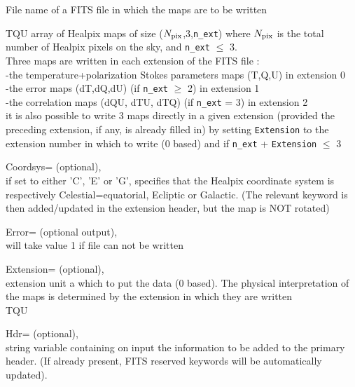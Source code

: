 \begin{qualifiers}
  \begin{qulist}{} %
 	\item[{File}] 
          name of a FITS file in which the maps are to be written

   \item[{TQU}]  array of Healpix maps of size ($N_{\rm pix}$,3,{\tt n\_ext}) where $N_{\rm pix}$ is the total
   number of Healpix pixels on the sky, and {\tt n\_ext} $\le$ 3.\\
     Three maps are written in each extension of the FITS file : \\
      -the temperature+polarization Stokes parameters maps (T,Q,U) in
   extension 0 \\
      -the error maps (dT,dQ,dU) (if {\tt n\_ext} $\ge$ 2) in extension 1 \\
      -the correlation maps (dQU, dTU, dTQ) (if {\tt n\_ext} = 3) in extension 2
\\
     it is also possible to write 3 maps directly in a given
     extension (provided the preceding extension, if any, is already
     filled in)
     by setting {\tt Extension} to the extension number in which to write
     (0 based) and if {\tt n\_ext} + {\tt Extension} $\le$ 3

       \item[{Coordsys=}] 
		  (optional), \\
		if set to either 'C', 'E' or 'G',  specifies that the
		Healpix coordinate system is respectively Celestial=equatorial,
		  Ecliptic or Galactic.
		(The relevant keyword is then added/updated in the extension
		  header, but the map is NOT rotated)

	\item[{Error=}] 
		(optional output), \\
		will take value 1 if file can not be written


       \item[{Extension=}]
		(optional), \\
	extension unit a which to put the data (0 based). The physical
		interpretation of the maps is determined by the
		extension in which they are written\\
	\seealso TQU

       \item[{Hdr=}]
		  (optional), \\
		string variable containing on input  the information to be added
		  to the primary header. (If already present, FITS reserved
		  keywords will be automatically updated).


\end{qulist}
\end{qualifiers}
